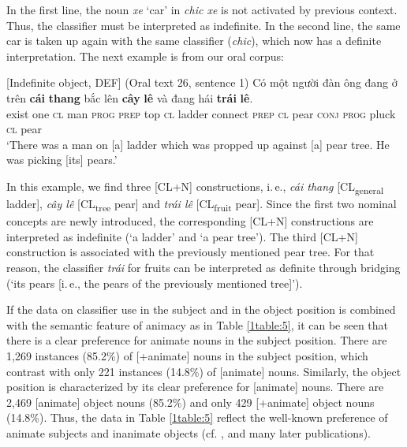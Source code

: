 \documentclass[output=paper]{langsci/langscibook}
\begin{document}
In the first line, the noun {\emph{xe}} `car' in {\emph{chi{\dae}c xe}} is not activated by previous context. Thus, the classifier must be interpreted as indefinite. In the second line, the same car is taken up again with the same classifier ({\emph{chi{\dae}c}}), which now has a definite interpretation. The next example is from our oral corpus:

\begin{samepage}
\begin{exe}
\ex\label{1ex:16}
[Indefinite object, \pm DEF] (Oral text 26, sentence 1)
\exi{}
\gll 	Có    một	người	{đàn ông}	đang			ở          		trên  {\textbf{cái}}  {\textbf{thang}}   bắc        lên       {\textbf{cây}}  {\textbf{lê}}  và         đang    hái       {\textbf{trái}}  {\textbf{lê}}. \\
	exist one	{\textsc{cl}}     man		{\textsc{prog}}		{\textsc{prep}}   	top   {\textsc{cl}}  ladder  connect  {\textsc{prep}}  {\textsc{cl}}  pear {\textsc{conj}}  {\textsc{prog}}   pluck  {\textsc{cl}}   pear\\
\glt `There was a man on [a] ladder which was propped up against [a] pear tree. He was picking [its] pears.'
\end{exe}
\end{samepage}

{
In this example, we find three [CL+N] constructions, i.\,e., {\emph{cái thang}} [CL\textsubscript{general} ladder], {\emph{cây lê}} [CL\textsubscript{tree} pear] and {\emph{trái lê}} [CL\textsubscript{fruit} pear]. Since the first two nominal concepts are newly introduced, the corresponding [CL+N] constructions are interpreted as indefinite (`a ladder' and `a pear tree'). The third [CL+N] construction is associated with the previously mentioned pear tree. For that reason, the classifier {\emph{trái}} for fruits can be interpreted as definite through bridging (`its pears [i.\,e., the pears of the previously mentioned tree]').
}

If the data on classifier use in the subject and in the object position is combined with the semantic feature of animacy as in Table \ref{1table:5}, it can be seen that there is a clear preference for animate nouns in the subject position. There are 1,269 instances (85.2\%) of [+animate] nouns in the subject position, which contrast with only 221 instances (14.8\%) of [\minus animate] nouns. Similarly, the object position is characterized by its clear preference for [\minus animate] nouns. There are 2,469 [\minus animate] object nouns (85.2\%) and only 429 [+animate] object nouns (14.8\%). Thus, the data in Table \ref{1table:5} reflect the well-known preference of animate subjects and inanimate objects (cf. \citealt{givon:79}, \citealt{dubois:87} and many later publications).
\end{document}
